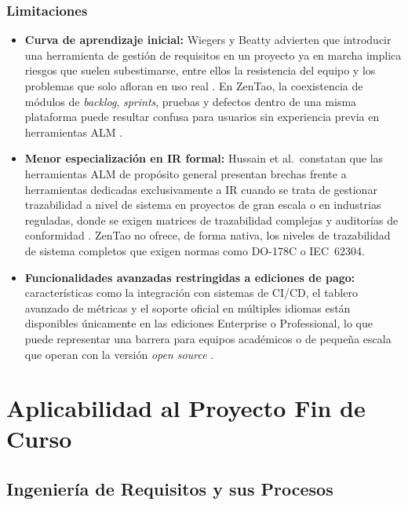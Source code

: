 \documentclass[journal,onecolumn]{IEEEtran}
\begin{document}
\subsubsection{Limitaciones}

\begin{itemize}
  \item \textbf{Curva de aprendizaje inicial:} Wiegers y Beatty advierten que introducir una
  herramienta de gestión de requisitos en un proyecto ya en marcha implica riesgos que suelen
  subestimarse, entre ellos la resistencia del equipo y los problemas que solo afloran en uso
  real \cite{wiegers2013}. En ZenTao, la coexistencia de módulos de \textit{backlog},
  \textit{sprints}, pruebas y defectos dentro de una misma plataforma puede resultar confusa
  para usuarios sin experiencia previa en herramientas ALM \cite{zentao2025}.

  \item \textbf{Menor especialización en IR formal:} Hussain et al.\ constatan que las
  herramientas ALM de propósito general presentan brechas frente a herramientas dedicadas
  exclusivamente a IR cuando se trata de gestionar trazabilidad a nivel de sistema en proyectos
  de gran escala o en industrias reguladas, donde se exigen matrices de trazabilidad complejas
  y auditorías de conformidad \cite{hussain2022}. ZenTao no ofrece, de forma nativa, los niveles
  de trazabilidad de sistema completos que exigen normas como DO-178C o IEC~62304.

  \item \textbf{Funcionalidades avanzadas restringidas a ediciones de pago:} características
  como la integración con sistemas de CI/CD, el tablero avanzado de métricas y el soporte
  oficial en múltiples idiomas están disponibles únicamente en las ediciones Enterprise o
  Professional, lo que puede representar una barrera para equipos académicos o de pequeña
  escala que operan con la versión \textit{open source} \cite{zentao2025}.
\end{itemize}


\section{Aplicabilidad al Proyecto Fin de Curso}

\subsection{Ingeniería de Requisitos y sus Procesos}
\end{document}
